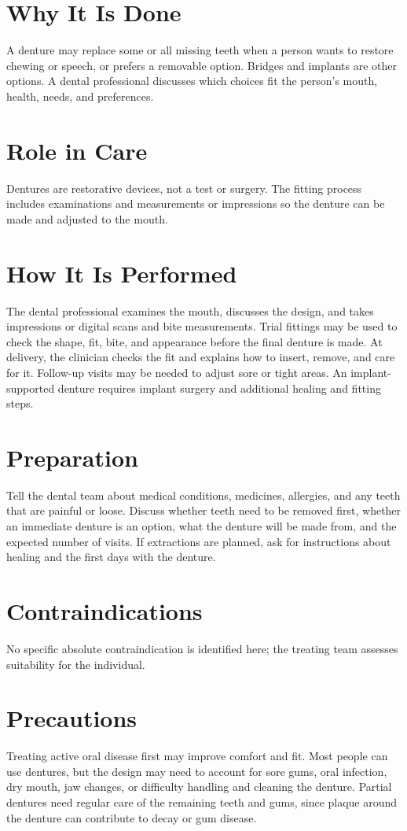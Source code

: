 \section*{Why It Is Done}
A denture may replace some or all missing teeth when a person wants to restore chewing or speech, or prefers a removable option. Bridges and implants are other options. A dental professional discusses which choices fit the person's mouth, health, needs, and preferences.

\section*{Role in Care}
Dentures are restorative devices, not a test or surgery. The fitting process includes examinations and measurements or impressions so the denture can be made and adjusted to the mouth.

\section*{How It Is Performed}
The dental professional examines the mouth, discusses the design, and takes impressions or digital scans and bite measurements. Trial fittings may be used to check the shape, fit, bite, and appearance before the final denture is made. At delivery, the clinician checks the fit and explains how to insert, remove, and care for it. Follow-up visits may be needed to adjust sore or tight areas. An implant-supported denture requires implant surgery and additional healing and fitting steps.

\section*{Preparation}
Tell the dental team about medical conditions, medicines, allergies, and any teeth that are painful or loose. Discuss whether teeth need to be removed first, whether an immediate denture is an option, what the denture will be made from, and the expected number of visits. If extractions are planned, ask for instructions about healing and the first days with the denture.

\section*{Contraindications}
No specific absolute contraindication is identified here; the treating team assesses suitability for the individual.

\section*{Precautions}
Treating active oral disease first may improve comfort and fit. Most people can use dentures, but the design may need to account for sore gums, oral infection, dry mouth, jaw changes, or difficulty handling and cleaning the denture. Partial dentures need regular care of the remaining teeth and gums, since plaque around the denture can contribute to decay or gum disease.

